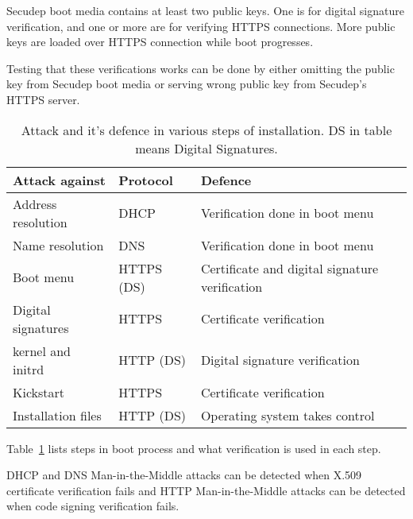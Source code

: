 Secudep boot media contains at least two public keys. One is for
digital signature verification, and one or more are for verifying
HTTPS connections. More public keys are loaded over HTTPS connection
while boot progresses.

Testing that these verifications works can be done by either omitting
the public key from Secudep boot media or serving wrong public key
from Secudep's HTTPS server.

\begin{table}[!ht]
  \def\arraystretch{1.1}%
  \begin{center}
    \begin{tabular}{| l | l | l |}
      \hline
      Attack against     & Protocol   & Defence                                        \\
      \hline
      Address resolution & DHCP       & Verification done in boot menu              \\
      Name resolution    & DNS        & Verification done in boot menu              \\
      Boot menu          & HTTPS (DS) & Certificate and digital signature verification \\
      Digital signatures & HTTPS      & Certificate verification                       \\
      kernel and initrd  & HTTP (DS)  & Digital signature verification                 \\
      Kickstart          & HTTPS      & Certificate verification                       \\
      Installation files & HTTP (DS)  & Operating system takes control                 \\
      \hline
    \end{tabular}
    \caption{Attack and it's defence in various steps of
      installation. DS in table means Digital
      Signatures.\label{tab:attack_and_defence}}
  \end{center}
\end{table}

Table~\ref{tab:attack_and_defence} lists steps in boot process and
what verification is used in each step.

DHCP and DNS Man-in-the-Middle attacks can be detected when X.509
certificate verification fails and HTTP Man-in-the-Middle attacks can
be detected when code signing verification fails.


